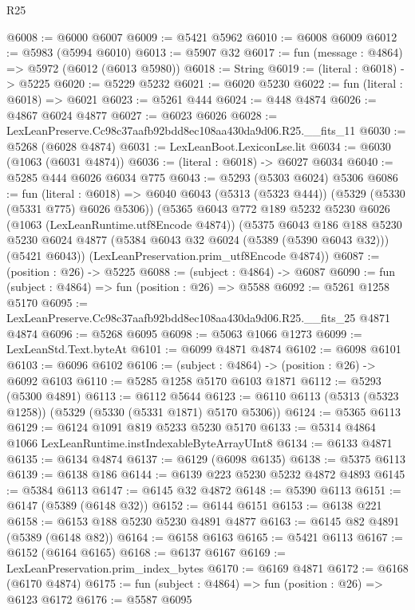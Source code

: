 \begin{lexlean}{R25}
\begin{coremodule}
@6008 := @6000 @6007
@6009 := @5421 @5962
@6010 := @6008 @6009
@6012 := @5983 (@5994 @6010)
@6013 := @5907 @32
@6017 := fun (message : @4864) => @5972 (@6012 (@6013 @5980))
@6018 := String
@6019 := (literal : @6018) -> @5225
@6020 := @5229 @5232
@6021 := @6020 @5230
@6022 := fun (literal : @6018) => @6021
@6023 := @5261 @444
@6024 := @448 @4874
@6026 := @4867 @6024 @4877
@6027 := @6023 @6026
@6028 := LexLeanPreserve.Cc98c37aafb92bdd8ec108aa430da9d06.R25.__fits_11
@6030 := @5268 (@6028 @4874)
@6031 := LexLeanBoot.LexiconLse.lit
@6034 := @6030 (@1063 (@6031 @4874))
@6036 := (literal : @6018) -> @6027 @6034
@6040 := @5285 @444 @6026 @6034 @775
@6043 := @5293 (@5303 @6024) @5306
@6086 := fun (literal : @6018) =>
  @6040
    @6043
    (@5313 (@5323 @444))
    (@5329 (@5330 (@5331 @775) @6026 @5306))
    (@5365
      @6043
      @772
      @189
      @5232
      @5230
      @6026
      (@1063 (LexLeanRuntime.utf8Encode @4874))
      (@5375
        @6043
        @186
        @188
        @5230
        @5230
        @6024
        @4877
        (@5384 @6043 @32 @6024 (@5389 (@5390 @6043 @32)))
        (@5421 @6043))
      (LexLeanPreservation.prim_utf8Encode @4874))
@6087 := (position : @26) -> @5225
@6088 := (subject : @4864) -> @6087
@6090 := fun (subject : @4864) => fun (position : @26) => @5588
@6092 := @5261 @1258 @5170
@6095 := LexLeanPreserve.Cc98c37aafb92bdd8ec108aa430da9d06.R25.__fits_25 @4871 @4874
@6096 := @5268 @6095
@6098 := @5063 @1066 @1273
@6099 := LexLeanStd.Text.byteAt
@6101 := @6099 @4871 @4874
@6102 := @6098 @6101
@6103 := @6096 @6102
@6106 := (subject : @4864) -> (position : @26) -> @6092 @6103
@6110 := @5285 @1258 @5170 @6103 @1871
@6112 := @5293 (@5300 @4891)
@6113 := @6112 @5644
@6123 := @6110 @6113 (@5313 (@5323 @1258)) (@5329 (@5330 (@5331 @1871) @5170 @5306))
@6124 := @5365 @6113
@6129 := @6124 @1091 @819 @5233 @5230 @5170
@6133 := @5314 @4864 @1066 LexLeanRuntime.instIndexableByteArrayUInt8
@6134 := @6133 @4871
@6135 := @6134 @4874
@6137 := @6129 (@6098 @6135)
@6138 := @5375 @6113
@6139 := @6138 @186
@6144 := @6139 @223 @5230 @5232 @4872 @4893
@6145 := @5384 @6113
@6147 := @6145 @32 @4872
@6148 := @5390 @6113
@6151 := @6147 (@5389 (@6148 @32))
@6152 := @6144 @6151
@6153 := @6138 @221
@6158 := @6153 @188 @5230 @5230 @4891 @4877
@6163 := @6145 @82 @4891 (@5389 (@6148 @82))
@6164 := @6158 @6163
@6165 := @5421 @6113
@6167 := @6152 (@6164 @6165)
@6168 := @6137 @6167
@6169 := LexLeanPreservation.prim_index_bytes
@6170 := @6169 @4871
@6172 := @6168 (@6170 @4874)
@6175 := fun (subject : @4864) => fun (position : @26) => @6123 @6172
@6176 := @5587 @6095

\end{coremodule}
\end{lexlean}

